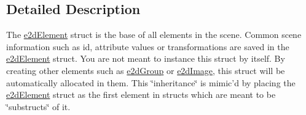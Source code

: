 \subsection{Detailed Description}
The \hyperlink{structe2d_element}{e2d\-Element} struct is the base of all elements in the scene. Common scene information such as id, attribute values or transformations are saved in the \hyperlink{structe2d_element}{e2d\-Element} struct. You are not meant to instance this struct by itself. By creating other elements such as \hyperlink{structe2d_group}{e2d\-Group} or \hyperlink{structe2d_image}{e2d\-Image}, this struct will be automatically allocated in them. This \char`\"{}inheritance\char`\"{} is mimic'd by placing the \hyperlink{structe2d_element}{e2d\-Element} struct as the first element in structs which are meant to be \char`\"{}substructs\char`\"{} of it. 

